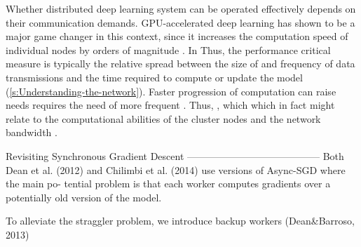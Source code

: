 


Whether distributed deep learning system can be operated effectively depends on their communication demands. GPU-accelerated deep learning has shown to be a major game changer in this context, since it increases the computation speed of individual nodes by orders of magnitude \cite{Langer}. In Thus, the performance critical measure is typically the relative spread between the size of and frequency of data transmissions and the time required to compute or update the model (\autoref{s:Understanding-the-network}).
Faster progression of computation can raise needs requires the need of more frequent . Thus, , which 
which in fact might relate to the computational abilities of the cluster nodes and the network bandwidth \cite{Langer}.  


Revisiting Synchronous Gradient Descent
-----------------------------------------
Both Dean et al. (2012) and Chilimbi et al. (2014) use versions of Async-SGD where the main po- tential problem is that each worker computes gradients over a potentially old version of the model.

To alleviate the straggler problem, we introduce backup workers (Dean&Barroso, 2013)
